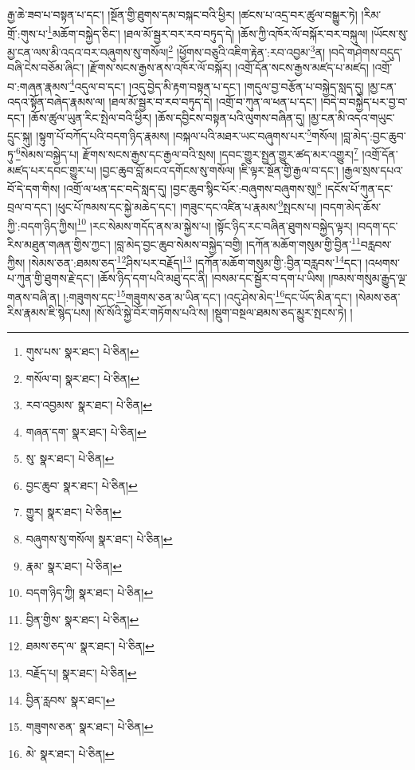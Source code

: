 རྒྱ་ཆེ་ཟབ་པ་བསྟན་པ་དང་། །སྔོན་གྱི་ཐུགས་དམ་བསྐང་བའི་ཕྱིར། །ཚངས་པ་འདྲ་བར་ཚུལ་བསྒྱུར་ཏེ། །རིམ་གྲོ་:གུས་པ་\footnote{གུས་པས་  སྣར་ཐང་།  པེ་ཅིན། }མཆོག་བསྐྱེད་ཅིང་། །ཐལ་མོ་སྦྱར་བར་རབ་བཏུད་དེ། །ཆོས་ཀྱི་འཁོར་ལོ་བསྐོར་བར་བསྐུལ། །ཡོངས་སུ་མྱ་ངན་ལས་མི་འདའ་བར་བཞུགས་སུ་གསོལ།\footnote{གསོལ་བ།  སྣར་ཐང་།  པེ་ཅིན། } །ཕྱོགས་བཅུའི་འཇིག་རྟེན་:རབ་འབྱམ་\footnote{རབ་འབྱམས་  སྣར་ཐང་།  པེ་ཅིན། }ན། །བདེ་གཤེགས་བདུད་བཞི་ངེས་བཅོམ་ཞིང་། །རྫོགས་སངས་རྒྱས་ནས་འཁོར་ལོ་བསྐོར། །འགྲོ་དོན་སངས་རྒྱས་མཛད་པ་མཛད། །འགྲོ་བ་:གཞན་རྣམས་\footnote{གཞན་དག་  སྣར་ཐང་།  པེ་ཅིན། }འདུལ་བ་དང་། །འདུ་བྱེད་མི་རྟག་བསྟན་པ་དང་། །གདུལ་བྱ་བརྩོན་པ་བསྐྱེད་སླད་དུ། །མྱ་ངན་འདའ་སྟོན་བཞེད་རྣམས་ལ། །ཐལ་མོ་སྦྱར་བ་རབ་བཏུད་དེ། །འགྲོ་བ་ཀུན་ལ་ཕན་པ་དང་། །བདེ་བ་བསྐྱེད་པར་བྱ་བ་དང་། །ཆོས་ཚུལ་ཡུན་རིང་སྤེལ་བའི་ཕྱིར། །ཆོས་དབྱིངས་བསྟན་པའི་ལུགས་བཞིན་དུ། །མྱ་ངན་མི་འདའ་གཡུང་དྲུང་སྐུ། །སྟུག་པོ་བཀོད་པའི་བདག་ཉིད་རྣམས། །བསྐལ་པའི་མཐར་ཡང་བཞུགས་པར་\footnote{སུ་  སྣར་ཐང་།  པེ་ཅིན། }གསོལ། །བླ་མེད་:བྱང་ཆུབ་ཏུ་\footnote{བྱང་ཆུབ་  སྣར་ཐང་།  པེ་ཅིན། }སེམས་བསྐྱེད་པ། རྫོགས་སངས་རྒྱས་དང་རྒྱལ་བའི་སྲས། །དབང་གྱུར་སྤྱན་གྱུར་ཚད་མར་འགྱུར།\footnote{གྱུར།  སྣར་ཐང་།  པེ་ཅིན། } །འགྲོ་དོན་མཛད་པར་དབང་གྱུར་པ། །བྱང་ཆུབ་བློ་མངའ་དགོངས་སུ་གསོལ། །ཇི་ལྟར་སྔོན་གྱི་རྒྱལ་བ་དང་། །རྒྱལ་སྲས་དཔའ་བོ་དེ་དག་གིས། །འགྲོ་ལ་ཕན་དང་བདེ་སླད་དུ། །བྱང་ཆུབ་སྙིང་པོར་:བཞུགས་བཞུགས་སུ།\footnote{བཞུགས་སུ་གསོལ།  སྣར་ཐང་།  པེ་ཅིན། } །དངོས་པོ་ཀུན་དང་བྲལ་བ་དང་། །ཕུང་པོ་ཁམས་དང་སྐྱེ་མཆེད་དང་། །གཟུང་དང་འཛིན་པ་རྣམས་\footnote{རྣམ་  སྣར་ཐང་།  པེ་ཅིན། }སྤངས་པ། །བདག་མེད་ཆོས་ཀྱི་:བདག་ཉིད་ཀྱིས།\footnote{བདག་ཉིད་ཀྱི།  སྣར་ཐང་།  པེ་ཅིན། } །རང་སེམས་གདོད་ནས་མ་སྐྱེས་པ། །སྟོང་ཉིད་རང་བཞིན་ཐུགས་བསྐྱེད་ལྟར། །བདག་དང་རིས་མཐུན་གཞན་གྱིས་ཀྱང་། །བླ་མེད་བྱང་ཆུབ་སེམས་བསྐྱེད་བགྱི། །དཀོན་མཆོག་གསུམ་གྱི་བྱིན་\footnote{བྱིན་གྱིས་  སྣར་ཐང་།  པེ་ཅིན། }བརླབས་ཀྱིས། །སེམས་ཅན་:ཐམས་ཅད་\footnote{ཐམས་ཅད་ལ་  སྣར་ཐང་།  པེ་ཅིན། }ཤིས་པར་བརྗོད།\footnote{བརྗོད་པ།  སྣར་ཐང་།  པེ་ཅིན། } །དཀོན་མཆོག་གསུམ་གྱི་:བྱིན་བརླབས་\footnote{བྱིན་རླབས་  སྣར་ཐང་། }དང་། །འཕགས་པ་ཀུན་གྱི་ཐུགས་རྗེ་དང་། །ཆོས་ཉིད་དག་པའི་མཐུ་དང་ནི། །བསམ་དང་སྦྱོར་བ་དག་པ་ཡིས། །ཁམས་གསུམ་རྒྱུད་ལྔ་གནས་བཞི་ན། །:གཟུགས་དང་\footnote{གཟུགས་ཅན་  སྣར་ཐང་།  པེ་ཅིན། }གཟུགས་ཅན་མ་ཡིན་དང་། །འདུ་ཤེས་མེད་\footnote{མེ་  སྣར་ཐང་།  པེ་ཅིན། }དང་ཡོད་མིན་དང་། །སེམས་ཅན་རིས་རྣམས་ཇི་སྙེད་པས། །སོ་སོའི་སྐྱེ་བོར་གཏོགས་པའི་ས། །སྡུག་བསྔལ་ཐམས་ཅད་མྱུར་སྤངས་ཏེ། །
